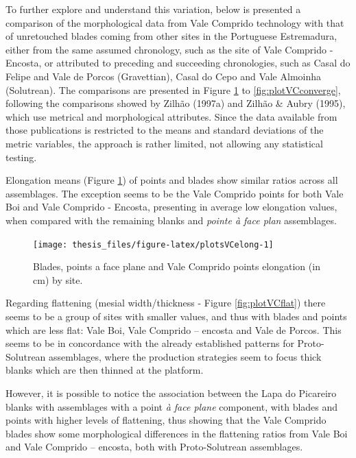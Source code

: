\documentclass[12pt,twoside]{reedthesis}
\begin{document}
To further explore and understand this variation, below is presented a comparison of the morphological data from Vale Comprido technology with that of unretouched blades coming from other sites in the Portuguese Estremadura, either from the same assumed chronology, such as the site of Vale Comprido - Encosta, or attributed to preceding and succeeding chronologies, such as Casal do Felipe and Vale de Porcos (Gravettian), Casal do Cepo and Vale Almoinha (Solutrean). The comparisons are presented in Figure \ref{fig:plotsVCelong} to \ref{fig:plotVCconverge}, following the comparisons showed by Zilhão (1997a) and Zilhão \& Aubry (1995), which use metrical and morphological attributes. Since the data available from those publications is restricted to the means and standard deviations of the metric variables, the approach is rather limited, not allowing any statistical testing.

Elongation means (Figure \ref{fig:plotsVCelong}) of points and blades show similar ratios across all assemblages. The exception seems to be the Vale Comprido points for both Vale Boi and Vale Comprido - Encosta, presenting in average low elongation values, when compared with the remaining blanks and \emph{pointe à face plan} assemblages.
\begin{figure}[H]

{\centering \texttt{[image: thesis\_files/figure-latex/plotsVCelong-1]} 

}

\caption{Blades, points a face plane and Vale Comprido points elongation (in cm) by site.}\label{fig:plotsVCelong}
\end{figure}
Regarding flattening (mesial width/thickness - Figure \ref{fig:plotVCflat}) there seems to be a group of sites with smaller values, and thus with blades and points which are less flat: Vale Boi, Vale Comprido -- encosta and Vale de Porcos. This seems to be in concordance with the already established patterns for Proto-Solutrean assemblages, where the production strategies seem to focus thick blanks which are then thinned at the platform.

However, it is possible to notice the association between the Lapa do Picareiro blanks with assemblages with a point \emph{à face plane} component, with blades and points with higher levels of flattening, thus showing that the Vale Comprido blades show some morphological differences in the flattening ratios from Vale Boi and Vale Comprido -- encosta, both with Proto-Solutrean assemblages.
\end{document}
